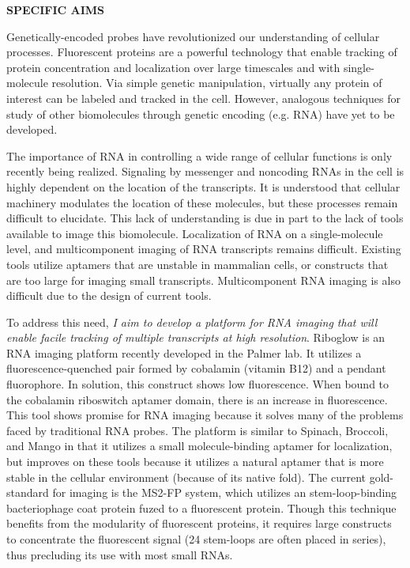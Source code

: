 
\noindent \begin{center}
{\bf SPECIFIC AIMS}
\end{center}

Genetically-encoded probes have revolutionized our understanding of cellular processes. Fluorescent proteins are a powerful technology that enable tracking of protein concentration and localization over large timescales and with single-molecule resolution. Via simple genetic manipulation, virtually any protein of interest can be labeled and tracked in the cell. However, analogous techniques for study of other biomolecules through genetic encoding (e.g. RNA) have yet to be developed.

The importance of RNA in controlling a wide range of cellular functions is only recently being realized.\cite{CechNoncodingRNARevolution2014} Signaling by messenger and noncoding RNAs in the cell is highly dependent on the location of the transcripts. It is understood that cellular machinery modulates the location of these molecules, but these processes remain difficult to elucidate.\cite{Muller-McNicollHowcellsget2013}
This lack of understanding is due in part to the lack of tools available to image this biomolecule. Localization of RNA on a single-molecule level, and multicomponent imaging of RNA transcripts remains difficult. Existing tools utilize aptamers that are unstable in mammalian cells\cite{EtzelSyntheticRiboswitchesPlug2017}, or constructs that are too large for imaging small transcripts. Multicomponent RNA imaging is also difficult due to the design of current tools.

To address this need, \textit{I aim to develop a platform for RNA imaging that will enable facile tracking of multiple transcripts at high resolution}. Riboglow is an RNA imaging platform recently developed in the Palmer lab. It utilizes a fluorescence-quenched pair formed by cobalamin (vitamin B12) and a pendant fluorophore. In solution, this construct shows low fluorescence. When bound to the cobalamin riboswitch aptamer domain\cite{JohnsonJrB12cofactorsdirectly2012}, there is an increase in fluorescence. This tool shows promise for RNA imaging because it solves many of the problems faced by traditional RNA probes. The platform is similar to Spinach\cite{PaigeRNAMimicsGreen2011}, Broccoli\cite{FilonovBroccoliRapidSelection2014}, and Mango\cite{AutourFluorogenicRNAMango2018,DolgosheinaRNAMangoAptamerFluorophore2014} in that it utilizes a small molecule-binding aptamer for localization, but improves on these tools because it utilizes a natural aptamer that is more stable in the cellular environment (because of its native fold). The current gold-standard for imaging is the MS2-FP system\cite{FuscoSinglemRNAMolecules2003}, which utilizes an stem-loop-binding bacteriophage coat protein fuzed to a fluorescent protein. Though this technique benefits from the modularity of fluorescent proteins, it requires large constructs to concentrate the fluorescent signal (24 stem-loops are often placed in series), thus precluding its use with most small RNAs.

